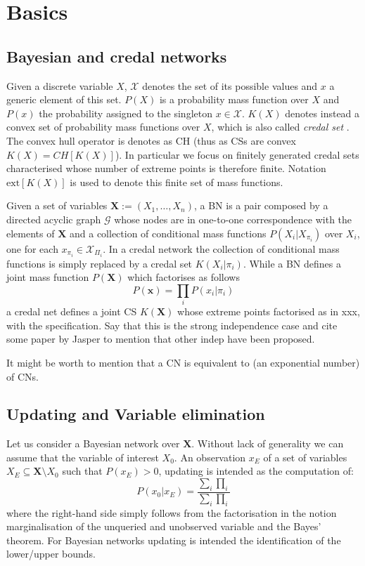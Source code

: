 \section{Basics}\label{sec:basics}
\subsection{Bayesian and credal networks}
Given a discrete variable $X$, $\mathcal{X}$ denotes the set of its possible values and $x$ a generic element of this set. $P(X)$ is a probability mass function over $X$ and $P(x)$ the probability assigned to the singleton $x\in\mathcal{X}$. $K(X)$ denotes instead a convex set of probability mass functions over $X$, which is also called \emph{credal set} \cite{xxx}. The convex hull operator is denotes as $\mathrm{CH}$ (thus as CSs are convex $K(X)=CH[K(X)]$). In particular we focus on finitely generated credal sets characterised whose number of extreme points is therefore finite. Notation $\mathrm{ext}[K(X)]$ is used to denote this finite set of mass functions.

Given a set of variables $\bm{X}:=(X_1,\ldots,X_n)$, a BN is a pair composed by a directed acyclic graph $\mathcal{G}$ whose nodes are in one-to-one correspondence with the elements of $\bm{X}$ and a collection of conditional mass functions $P(X_i|X_{\pi_i})$ over $X_i$, one for each $x_{\pi_i}\in\mathcal{X}_{\Pi_i}$. In a credal network the collection of conditional mass functions is simply replaced by a credal set $K(X_i|\pi_i)$. While a BN defines a joint mass function $P(\bm{X})$ which factorises as follows
\[ P(\bm{x}) = \prod_i P(x_i|\pi_i) \]
a credal net defines a joint CS $K(\bm{X})$ whose extreme points factorised as in xxx, with the specification. Say that this is the strong independence case and cite some paper by Jasper to mention that other indep have been proposed.

It might be worth to mention that a CN is equivalent to (an exponential number) of CNs.

\subsection{Updating and Variable elimination}
Let us consider a Bayesian network over $\bm{X}$. Without lack of generality we can assume that the variable of interest $X_0$. An observation $x_E$ of a set of variables $X_E \subseteq \bm{X} \setminus X_0$ such that $P(x_E)>0$, updating is intended as the computation of:
\[ P(x_0|x_E) =\frac{\sum_i \prod_i }{\sum_i \prod_i} \]
where the right-hand side simply follows from the factorisation in \cite{x} the notion marginalisation of the unqueried and unobserved variable and the Bayes' theorem. For Bayesian networks updating is intended the identification of the lower/upper bounds.

